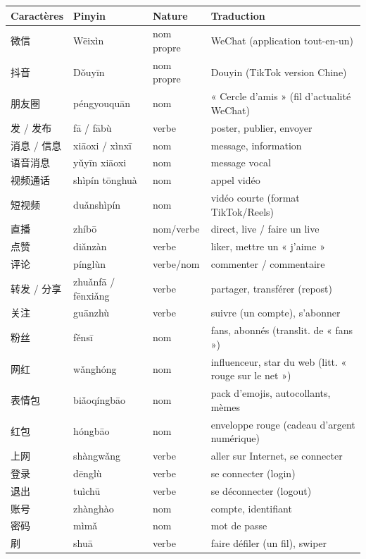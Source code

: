 \documentclass[11pt]{article}
\begin{document}
\begin{center}
\begin{tabularx}{\linewidth}{|X|X|X|X|}
\hline
\rowcolor{popblueL} Caractères & Pinyin & Nature & Traduction \\
\hline
微信 & Wēixìn & nom propre & WeChat (application tout-en-un) \\
\hline
抖音 & Dǒuyīn & nom propre & Douyin (TikTok version Chine) \\
\hline
朋友圈 & péngyouquān & nom & « Cercle d'amis » (fil d'actualité WeChat) \\
\hline
发 / 发布 & fā / fābù & verbe & poster, publier, envoyer \\
\hline
消息 / 信息 & xiāoxi / xìnxī & nom & message, information \\
\hline
语音消息 & yǔyīn xiāoxi & nom & message vocal \\
\hline
视频通话 & shìpín tōnghuà & nom & appel vidéo \\
\hline
短视频 & duǎnshìpín & nom & vidéo courte (format TikTok/Reels) \\
\hline
直播 & zhíbō & nom/verbe & direct, live / faire un live \\
\hline
点赞 & diǎnzàn & verbe & liker, mettre un « j'aime » \\
\hline
评论 & pínglùn & verbe/nom & commenter / commentaire \\
\hline
转发 / 分享 & zhuǎnfā / fēnxiǎng & verbe & partager, transférer (repost) \\
\hline
关注 & guānzhù & verbe & suivre (un compte), s'abonner \\
\hline
粉丝 & fěnsī & nom & fans, abonnés (translit. de « fans ») \\
\hline
网红 & wǎnghóng & nom & influenceur, star du web (litt. « rouge sur le net ») \\
\hline
表情包 & biǎoqíngbāo & nom & pack d'emojis, autocollants, mèmes \\
\hline
红包 & hóngbāo & nom & enveloppe rouge (cadeau d'argent numérique) \\
\hline
上网 & shàngwǎng & verbe & aller sur Internet, se connecter \\
\hline
登录 & dēnglù & verbe & se connecter (login) \\
\hline
退出 & tuìchū & verbe & se déconnecter (logout) \\
\hline
账号 & zhànghào & nom & compte, identifiant \\
\hline
密码 & mìmǎ & nom & mot de passe \\
\hline
刷 & shuā & verbe & faire défiler (un fil), swiper \\
\hline
\end{tabularx}
\end{center}
\end{document}

